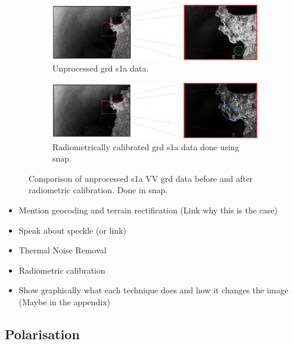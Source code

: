 \begin{figure} [H]
    \centering
    \begin{subfigure}{0.95\textwidth}
        \includegraphics[width=\textwidth]{Figures/Theory/unprocessedSARData.pdf}
        \caption{Unprocessed \acs{grd} \acs{s1a} data.}
        \label{fig:theory.data.radiometric.unprocessed}
    \end{subfigure}   
    \begin{subfigure}{0.95\textwidth}
        \includegraphics[width=\textwidth]{Figures/Theory/thermalNoiseCalibratedSARData.pdf}
        \caption{Radiometrically calibrated \acs{grd} \acs{s1a} data done using \acs{snap}.}
        \label{fig:theory.data.radiometric}
    \end{subfigure}     
    \caption{Comparison of unprocessed \acs{s1a} VV \acs{grd} data before and after radiometric calibration. Done in \acs{snap}.}
    \label{fig:theory.data.radiometricCalibration}
\end{figure}

\begin{itemize}
    \item Mention geocoding and terrain rectification (Link why this is the case)
    \item Speak about speckle (or link)
    \item Thermal Noise Removal
    \item Radiometric calibration
    \item Show graphically what each technique does and how it changes the image (Maybe in the appendix)
\end{itemize}

\subsection{Polarisation} \label{subsec:theory.sar.polarisation}

